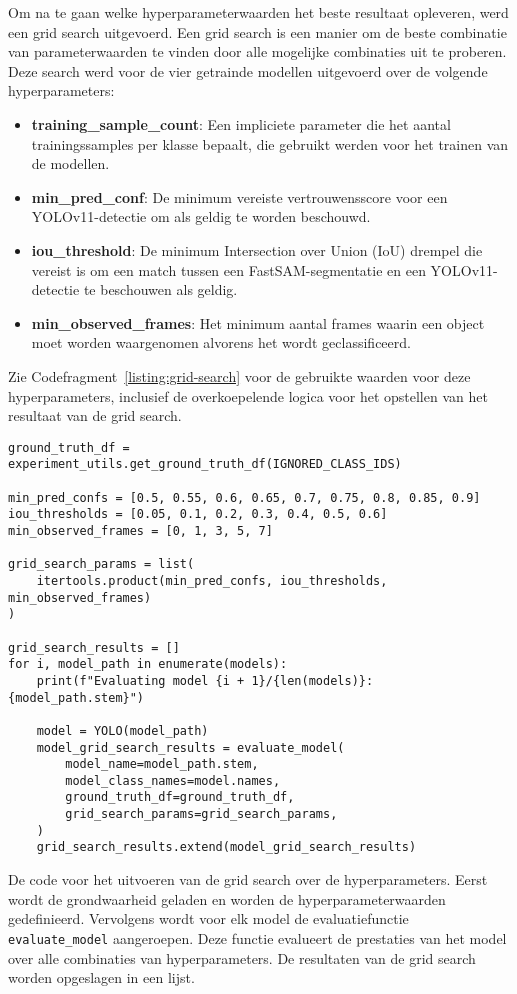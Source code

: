 Om na te gaan welke hyperparameterwaarden het beste resultaat opleveren, werd een grid search uitgevoerd.
Een grid search is een manier om de beste combinatie van parameterwaarden te vinden door alle mogelijke combinaties uit te proberen.
Deze search werd voor de vier getrainde modellen uitgevoerd over de volgende hyperparameters:
\begin{itemize}
    \item \textbf{training\_sample\_count}: Een impliciete parameter die het aantal trainingssamples per klasse bepaalt, die gebruikt werden voor het trainen van de modellen.
    \item \textbf{min\_pred\_conf}: De minimum vereiste vertrouwensscore voor een YOLOv11-detectie om als geldig te worden beschouwd.
    \item \textbf{iou\_threshold}: De minimum Intersection over Union (IoU) drempel die vereist is om een match tussen een FastSAM-segmentatie en een YOLOv11-detectie te beschouwen als geldig.
    \item \textbf{min\_observed\_frames}: Het minimum aantal frames waarin een object moet worden waargenomen alvorens het wordt geclassificeerd.
\end{itemize}
Zie Codefragment~\ref{listing:grid-search} voor de gebruikte waarden voor deze hyperparameters, 
inclusief de overkoepelende logica voor het opstellen van het resultaat van de grid search.

\begin{listing}[H]
  \begin{verbatim}
ground_truth_df = experiment_utils.get_ground_truth_df(IGNORED_CLASS_IDS)

min_pred_confs = [0.5, 0.55, 0.6, 0.65, 0.7, 0.75, 0.8, 0.85, 0.9]
iou_thresholds = [0.05, 0.1, 0.2, 0.3, 0.4, 0.5, 0.6]
min_observed_frames = [0, 1, 3, 5, 7]

grid_search_params = list(
    itertools.product(min_pred_confs, iou_thresholds, min_observed_frames)
)

grid_search_results = []
for i, model_path in enumerate(models):
    print(f"Evaluating model {i + 1}/{len(models)}: {model_path.stem}")

    model = YOLO(model_path)
    model_grid_search_results = evaluate_model(
        model_name=model_path.stem,
        model_class_names=model.names,
        ground_truth_df=ground_truth_df,
        grid_search_params=grid_search_params,
    )
    grid_search_results.extend(model_grid_search_results)
  \end{verbatim}
  \caption[Code voor het uitvoeren van de grid search over hyperparameters]{
    \label{listing:grid-search}
        De code voor het uitvoeren van de grid search over de hyperparameters.
        Eerst wordt de grondwaarheid geladen en worden de hyperparameterwaarden gedefinieerd. 
        Vervolgens wordt voor elk model de evaluatiefunctie \texttt{evaluate\_model} aangeroepen.
        Deze functie evalueert de prestaties van het model over alle combinaties van hyperparameters.
        De resultaten van de grid search worden opgeslagen in een lijst.
    }
\end{listing}

